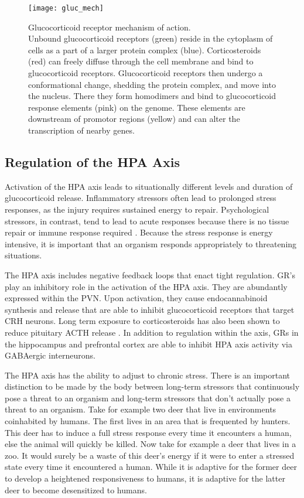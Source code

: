 \documentclass[12pt,twoside]{reedthesis}
\begin{document}
\begin{figure}[htbp] 
\begin{centering} 
\texttt{[image: gluc\_mech]}
\caption[Glucocorticoid receptor mechanism of action]{\footnotesize{Glucocorticoid receptor
    mechanism of action. \\ Unbound glucocorticoid receptors (green) reside in the
    cytoplasm of cells as a part of a larger protein complex (blue). Corticosteroids (red) can freely diffuse through the
    cell membrane and bind to glucocorticoid receptors. Glucocorticoid receptors
    then undergo a conformational change, shedding the protein complex, and
    move into the nucleus. There they form homodimers and bind to
    glucocorticoid response elements (pink) on the genome. These elements are
    downstream of promotor regions (yellow) and can alter the transcription of
    nearby genes.}}
\label{gluc}
\end{centering} 
\end{figure}

\subsection{Regulation of the HPA Axis}
Activation of the HPA axis leads to situationally different levels and duration of
glucocorticoid release. Inflammatory stressors often lead to prolonged stress
responses, as the injury requires sustained energy to repair. Psychological
stressors, in contrast, tend to lead to acute responses because there is no
tissue repair or immune response required \citep{terjung_regulation_2016}. Because
the stress response is energy intensive, it is important that an organism
responds appropriately to threatening situations.

The HPA axis includes negative feedback loops that enact tight regulation.
GR's play an inhibitory role in the activation of the HPA axis. They are abundantly expressed
within the PVN. Upon activation, they cause endocannabinoid synthesis and
release that are able to inhibit glucocorticoid receptors that target CRH
neurons. Long term exposure to corticosteroids has also been shown to reduce
pituitary ACTH release \citep{terjung_hypothalamic-pituitary-adrenal_2015}. In addition to regulation within the
axis, GRs in the hippocampus and prefrontal cortex are able to
inhibit HPA axis activity via GABAergic interneurons. 

The HPA axis has the ability to adjust to chronic stress. There is an
important distinction to be made by the body between long-term stressors that continuously
pose a threat to an organism and long-term stressors that don't actually pose a
threat to an organism. Take for example two deer that live in environments
coinhabited by humans. The first lives in an area that is
frequented by hunters. This deer has to induce a full stress response
every time it encounters a human, else the animal will quickly be killed.
Now take for example a deer that lives in a zoo. It would surely be a waste of this deer's
energy if it were to enter a stressed state every time it encountered a human.
While it is adaptive for the former deer to develop a heightened responsiveness
to humans, it is adaptive for the latter deer to become desensitized to humans.
\end{document}
